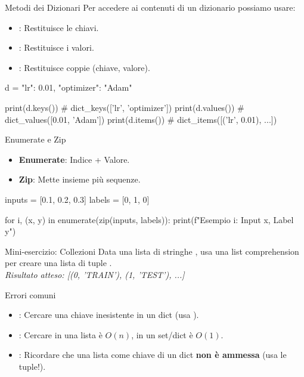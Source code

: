 \documentclass[12pt,aspectratio=169,notheorems]{beamer}
\begin{document}
\begin{frame}[fragile]{Metodi dei Dizionari}
    Per accedere ai contenuti di un dizionario possiamo usare:
    \begin{itemize}
        \item {}: Restituisce le chiavi.
        \item {}: Restituisce i valori.
        \item {}: Restituisce coppie (chiave, valore).
    \end{itemize}
    \begin{python}
        d = {"lr": 0.01, "optimizer": "Adam"}

        print(d.keys())   # dict_keys(['lr', 'optimizer'])
        print(d.values()) # dict_values([0.01, 'Adam'])
        print(d.items())  # dict_items([('lr', 0.01), ...])
    \end{python}
\end{frame}


\begin{frame}[fragile]{Enumerate e Zip}
    \begin{itemize}
        \item \textbf{Enumerate}: Indice + Valore.
        \item \textbf{Zip}: Mette insieme più sequenze.
    \end{itemize}
    \begin{python}
        inputs = [0.1, 0.2, 0.3]
        labels = [0, 1, 0]

        for i, (x, y) in enumerate(zip(inputs, labels)):
            print(f"Esempio {i}: Input {x}, Label {y}")
    \end{python}
\end{frame}

\begin{frame}{Mini-esercizio: Collezioni}
    Data una lista di stringhe , usa una list comprehension per creare una lista di tuple .
    \\ \textit{Risultato atteso: [(0, 'TRAIN'), (1, 'TEST'), ...]}
\end{frame}

\begin{frame}{Errori comuni}
    \begin{itemize}
        \item {}: Cercare una chiave inesistente in un dict (usa ).
        \item {}: Cercare in una lista è $O(n)$, in un set/dict è $O(1)$.
        \item {}: Ricordare che una lista come chiave di un dict \textbf{non è ammessa} (usa le tuple!).
    \end{itemize}
\end{frame}
\end{document}
